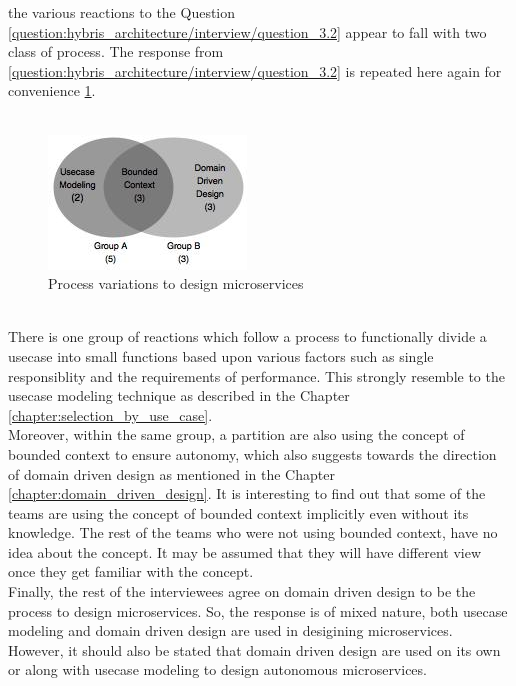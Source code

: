 the various reactions to the Question \ref{question:hybris_architecture/interview/question_3.2} appear to fall with two class of process. The response from \ref{question:hybris_architecture/interview/question_3.2} is repeated here again for convenience \ref{fig:hybris_architecture/interview/process_variations_to_design_microservices}.\\
\\
\begin{figure}[H]
\begin{center}
\includegraphics[scale=0.5]{figures/hybris-architecture-three}
\caption{Process variations to design microservices}
\label{fig:hybris_architecture/interview/process_variations_to_design_microservices}
\end{center}
\end{figure}
\\
There is one group of reactions which follow a process to functionally divide a usecase into small functions based upon various factors such as single responsiblity and the requirements of performance. This strongly resemble to the usecase modeling technique as described in the Chapter \ref{chapter:selection_by_use_case}. 
\\Moreover, within the same group, a partition are also using the concept of bounded context to ensure autonomy, which also suggests towards the direction of domain driven design as mentioned in the Chapter \ref{chapter:domain_driven_design}. It is interesting to find out that some of the teams are using the concept of bounded context implicitly even without its knowledge. The rest of the teams who were not using bounded context, have no idea about the concept. It may be assumed that they will have different view once they get familiar with the concept.
\\
Finally, the rest of the interviewees agree on domain driven design to be the process to design microservices. So, the  response is of mixed nature, both usecase modeling and domain driven design are used in desigining microservices. However, it should also be stated that domain driven design are used on its own or along with usecase modeling to design autonomous microservices.

